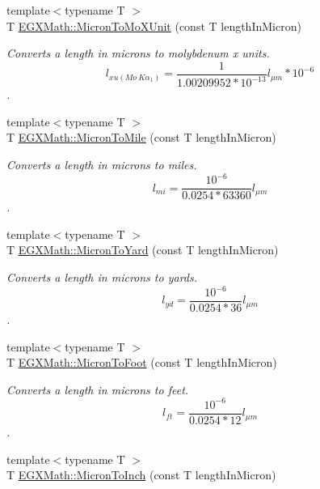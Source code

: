\begin{DoxyCompactItemize}
{\footnotesize template$<$typename T $>$ }\\T \mbox{\hyperlink{group___e_g_x_math-_conversions-_length_conversions-_non-_s_i-_micron-_non-_s_i_ga4bdfec28657cb037fc0830a95ceb79ca}{E\+G\+X\+Math\+::\+Micron\+To\+Mo\+X\+Unit}} (const T length\+In\+Micron)
\begin{DoxyCompactList}\small\item\em Converts a length in microns to molybdenum x units. \[ l_{xu(Mo\ K\alpha_1)}=\frac{1}{1.00209952*10^{-13}} l_{\mu m} * 10^{-6}\]. \end{DoxyCompactList}\item 
{\footnotesize template$<$typename T $>$ }\\T \mbox{\hyperlink{group___e_g_x_math-_conversions-_length_conversions-_non-_s_i-_micron-_imperial_ga4a6e2d3df67af4008be36f3899c1ca19}{E\+G\+X\+Math\+::\+Micron\+To\+Mile}} (const T length\+In\+Micron)
\begin{DoxyCompactList}\small\item\em Converts a length in microns to miles. \[ l_{mi}=\frac{10^{-6}}{0.0254 * 63360} l_{\mu m} \]. \end{DoxyCompactList}\item 
{\footnotesize template$<$typename T $>$ }\\T \mbox{\hyperlink{group___e_g_x_math-_conversions-_length_conversions-_non-_s_i-_micron-_imperial_gae986c2e4dc5b38e249a8ec2fa2a3a0ea}{E\+G\+X\+Math\+::\+Micron\+To\+Yard}} (const T length\+In\+Micron)
\begin{DoxyCompactList}\small\item\em Converts a length in microns to yards. \[ l_{yd}= \frac{10^{-6}}{0.0254 * 36} l_{\mu m} \]. \end{DoxyCompactList}\item 
{\footnotesize template$<$typename T $>$ }\\T \mbox{\hyperlink{group___e_g_x_math-_conversions-_length_conversions-_non-_s_i-_micron-_imperial_gab90a87773543173f5b774b6ccb646b5f}{E\+G\+X\+Math\+::\+Micron\+To\+Foot}} (const T length\+In\+Micron)
\begin{DoxyCompactList}\small\item\em Converts a length in microns to feet. \[ l_{ft}= \frac{10^{-6}}{0.0254 * 12} l_{\mu m} \]. \end{DoxyCompactList}\item 
{\footnotesize template$<$typename T $>$ }\\T \mbox{\hyperlink{group___e_g_x_math-_conversions-_length_conversions-_non-_s_i-_micron-_imperial_ga12a0ceda3109e1f972dd62a797c78503}{E\+G\+X\+Math\+::\+Micron\+To\+Inch}} (const T length\+In\+Micron)

\end{DoxyCompactItemize}
